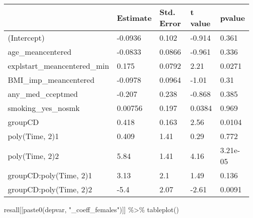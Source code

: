 \documentclass[
]{article}
\newenvironment{Shaded}{\begin{snugshade}}{\end{snugshade}}
\newcommand{\FunctionTok}[1]{\textcolor[rgb]{0.00,0.00,0.00}{#1}}
\newcommand{\NormalTok}[1]{#1}
\newcommand{\SpecialCharTok}[1]{\textcolor[rgb]{0.00,0.00,0.00}{#1}}
\newcommand{\StringTok}[1]{\textcolor[rgb]{0.31,0.60,0.02}{#1}}
\begin{document}
\begin{table}
\centering
\begin{tabular}[t]{l|l|l|l|l}
\hline
  & Estimate & Std. Error & t value & pvalue\\
\hline
(Intercept) & -0.0936 & 0.102 & -0.914 & 0.361\\
\hline
age\_meancentered & -0.0833 & 0.0866 & -0.961 & 0.336\\
\hline
explstart\_meancentered\_min & 0.175 & 0.0792 & 2.21 & 0.0271\\
\hline
BMI\_imp\_meancentered & -0.0978 & 0.0964 & -1.01 & 0.31\\
\hline
any\_med\_cceptmed & -0.207 & 0.238 & -0.868 & 0.385\\
\hline
smoking\_yes\_nosmk & 0.00756 & 0.197 & 0.0384 & 0.969\\
\hline
groupCD & 0.418 & 0.163 & 2.56 & 0.0104\\
\hline
poly(Time, 2)1 & 0.409 & 1.41 & 0.29 & 0.772\\
\hline
poly(Time, 2)2 & 5.84 & 1.41 & 4.16 & 3.21e-05\\
\hline
groupCD:poly(Time, 2)1 & 3.13 & 2.1 & 1.49 & 0.136\\
\hline
groupCD:poly(Time, 2)2 & -5.4 & 2.07 & -2.61 & 0.0091\\
\hline
\end{tabular}
\end{table}

\begin{Shaded}
\begin{Highlighting}[]
\NormalTok{resall[[}\FunctionTok{paste0}\NormalTok{(depvar, }\StringTok{"\_coeff\_females"}\NormalTok{)]] }\SpecialCharTok{\%\textgreater{}\%} \FunctionTok{tableplot}\NormalTok{()}
\end{Highlighting}
\end{Shaded}
\end{document}
